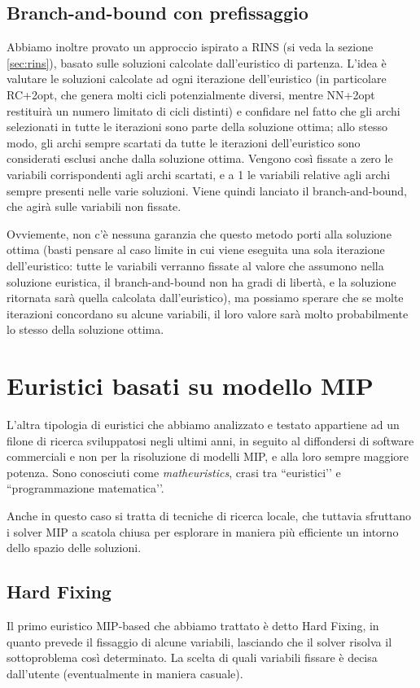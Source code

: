 \subsection{Branch-and-bound con prefissaggio}
Abbiamo inoltre provato un approccio ispirato a RINS (si veda la sezione \ref{sec:rins}), basato sulle soluzioni calcolate dall’euristico di partenza. L’idea è valutare le soluzioni calcolate ad ogni iterazione dell’euristico (in particolare RC+2opt, che genera molti cicli potenzialmente diversi, mentre NN+2opt restituirà un numero limitato di cicli distinti) e confidare nel fatto che gli archi selezionati in tutte le iterazioni sono parte della soluzione ottima; allo stesso modo, gli archi sempre scartati da tutte le iterazioni dell’euristico sono considerati esclusi anche dalla soluzione ottima. Vengono così fissate a zero le variabili corrispondenti agli archi scartati, e a 1 le variabili relative agli archi sempre presenti nelle varie soluzioni. Viene quindi lanciato il branch-and-bound, che agirà sulle variabili non fissate.

Ovviemente, non c’è nessuna garanzia che questo metodo porti alla soluzione ottima (basti pensare al caso limite in cui viene eseguita una sola iterazione dell’euristico: tutte le variabili verranno fissate al valore che assumono nella soluzione euristica, il branch-and-bound non ha gradi di libertà, e la soluzione ritornata sarà quella calcolata dall’euristico), ma possiamo sperare che se molte iterazioni concordano su alcune variabili, il loro valore sarà molto probabilmente lo stesso della soluzione ottima.

\section{Euristici basati su modello MIP}
L’altra tipologia di euristici che abbiamo analizzato e testato appartiene ad un filone di ricerca sviluppatosi negli ultimi anni, in seguito al diffondersi di software commerciali e non per la risoluzione di modelli MIP, e alla loro sempre maggiore potenza. Sono conosciuti come \textit{matheuristics}, crasi tra ``euristici’’ e ``programmazione matematica’’.

Anche in questo caso si tratta di tecniche di ricerca locale, che tuttavia sfruttano i solver MIP a scatola chiusa per esplorare in maniera più efficiente un intorno dello spazio delle soluzioni.

\subsection{Hard Fixing}
Il primo euristico MIP-based che abbiamo trattato è detto Hard Fixing, in quanto prevede il fissaggio di alcune variabili, lasciando che il solver risolva il sottoproblema così determinato. La scelta di quali variabili fissare è decisa dall’utente (eventualmente in maniera casuale).

